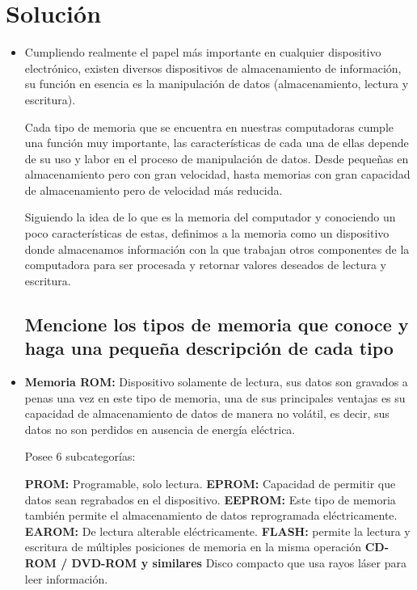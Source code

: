 \section{Solución}
\begin{itemize}

    \subsection{Defina que es la memoria del computador}
    \item Cumpliendo realmente el papel más importante en cualquier dispositivo electrónico, existen diversos dispositivos de almacenamiento de información, su función en esencia es la manipulación de datos (almacenamiento, lectura y escritura).
    
    Cada tipo de memoria que se encuentra en nuestras computadoras cumple una función muy importante, las características de cada una de ellas depende de su uso y labor en el proceso de manipulación de datos. Desde pequeñas en almacenamiento pero con gran velocidad, hasta memorias con gran capacidad de almacenamiento pero de velocidad más reducida.
    
    Siguiendo la idea de lo que es la memoria del computador y conociendo un poco características de estas, definimos a la memoria como un dispositivo donde almacenamos información con la que trabajan otros componentes de la computadora para ser procesada y retornar valores deseados de lectura y escritura.
    
    
    
    \subsection{ Mencione los tipos de memoria que conoce y haga una pequeña descripción de cada tipo}
    \item \textbf{Memoria ROM: } Dispositivo solamente de lectura, sus datos son gravados a penas una vez en este tipo de memoria, una de sus principales ventajas es su capacidad de almacenamiento  de datos de manera no volátil, es decir, sus datos no son perdidos en ausencia de energía eléctrica.
    
    Posee 6 subcategorías:
    
    \textbf{PROM:} Programable, solo lectura. \newline
    \textbf{EPROM:} Capacidad de permitir que datos sean regrabados en el dispositivo. \newline
    \textbf{EEPROM:} Este tipo de memoria también permite el almacenamiento de datos reprogramada eléctricamente. \newline
    \textbf{EAROM:} De lectura alterable eléctricamente. \newline
    \textbf{FLASH:} permite la lectura y escritura de múltiples posiciones de memoria en la misma operación \newline
    \textbf{CD-ROM / DVD-ROM y similares} Disco compacto que usa rayos láser para leer información. \newline
    

\end{itemize}
